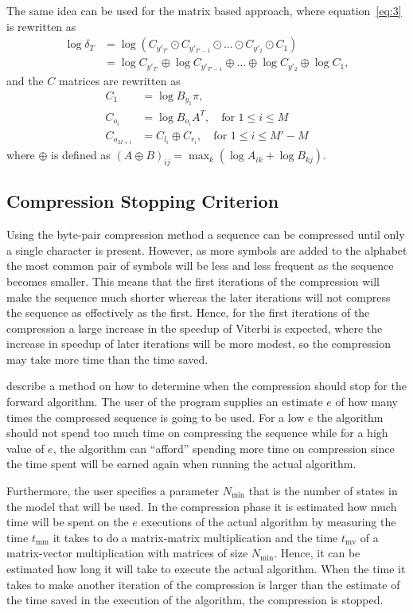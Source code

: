 The same idea can be used for the matrix based approach, where
equation~\eqref{eq:3} is rewritten as
\begin{align*}
  \log \delta_T &= \log \left(C_{y'_{T'}} \odot C_{y'_{T'-1}} \odot \dots \odot
                  C_{y'_2} \odot C_1 \right) \\
                &= \log C_{y'_{T'}} \oplus \log C_{y'_{T'-1}} \oplus \dots \oplus
                  \log C_{y'_2} \oplus \log C_1,
\end{align*}
and the $C$ matrices are rewritten as
\begin{align*}
  C_1 &= \log B_{y_1} \pi, \\
  C_{o_i} &= \log B_{o_i} A^T, \quad \text{for }1 \le i \le M\\
  C_{o_{M + i}} &= C_{l_i} \oplus C_{r_i} , \quad \text{for }1 \le i \le M' - M
\end{align*}
where $\oplus$ is defined as
${ \left( A \oplus B \right)}_{ij} = \max_k \left( \log A_{ik} + \log B_{kj}
\right)$.


\subsection{Compression Stopping Criterion}
\label{sec:compr-stopp-crit}

Using the byte-pair compression method a sequence can be compressed until only
a single character is present. However, as more symbols are added to the
alphabet the most common pair of symbols will be less and less frequent as the
sequence becomes smaller. This means that the first iterations of the
compression will make the sequence much shorter whereas the later iterations
will not compress the sequence as effectively as the first. Hence, for the
first iterations of the compression a large increase in the speedup of Viterbi
is expected, where the increase in speedup of later iterations will be more
modest, so the compression may take more time than the time saved.

\citet{sand2013ziphmmlib} describe a method on how to determine when the
compression should stop for the forward algorithm. The user of the program
supplies an estimate $e$ of how many times the compressed sequence is going to
be used. For a low $e$ the algorithm should not spend too much time on
compressing the sequence while for a high value of $e$, the algorithm can
``afford'' spending more time on compression since the time spent will be
earned again when running the actual algorithm.

Furthermore, the user specifies a parameter $N_{\text{min}}$ that is the number
of states in the model that will be used. In the compression phase it is
estimated how much time will be spent on the $e$ executions of the actual
algorithm by measuring the time $t_{\text{mm}}$ it takes to do a matrix-matrix
multiplication and the time $t_{\text{mv}}$ of a matrix-vector multiplication
with matrices of size $N_{\text{min}}$. Hence, it can be estimated how long it
will take to execute the actual algorithm. When the time it takes to make
another iteration of the compression is larger than the estimate of the time
saved in the execution of the algorithm, the compression is stopped.

